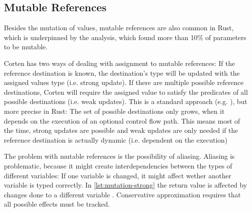 \documentclass[twoside, english]{sdqthesis}
\theoremstyle{definition}
\begin{document}
\subsection{Mutable References}\label{subsec:mutable-references}

Besides the mutation of values, mutable references are also common in Rust, which is underpinned by the analysis, which found more than 10\% of parameters to be mutable.

Corten has two ways of dealing with assignment to mutable references: If the reference destination is known, the destination's type will be updated with the assigned values type (i.e. strong update). If there are multiple possible reference destinations, Corten will require the assigned value to satisfy the predicates of all possible destinations (i.e. weak updates). This is a standard approach (e.g. \cite{kloos_asynchronous_2015}), but more precise in Rust: The set of possible destinations only grows, when it depends on the execution of an optional control flow path. This means most of the time, strong updates are possible and weak updates are only needed if the reference destination is actually dynamic (i.e. dependent on the execution) 

The problem with mutable references is the possibility of aliasing. Aliasing is problematic, because it might create interdependencies between the types of different variables: If one variable is changed, it might affect wether another variable is typed correctly. In \cref{lst:mutation-strong} the return value  is affected by changes done to a different variable . Conservative approximation requires that all possible effects must be tracked. 

\end{document}
